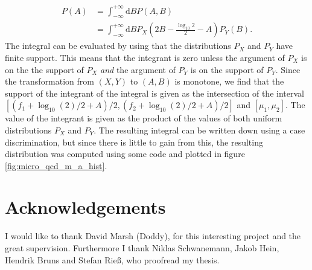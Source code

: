 \documentclass[twoside,a4paper, 12pt]{article}
\newcommand{\diff}{\mathrm{d}}
\numberwithin{equation}{section}
\begin{document}
\begin{align*}
    P(A) &= \int_{- \infty}^{+ \infty} \diff B P(A, B) \\
         &= \int_{- \infty}^{+ \infty} \diff B P_X(2 B - \frac{\log_{10} 2}{2} - A) P_{Y}(B).
\end{align*}
The integral can be evaluated by using that the distributions $P_X$ and $P_Y$ have finite support.
This means that the integrant is zero unless the argument of $P_X$ is on the the support of $P_X$ \emph{and} the argument of 
$P_Y$ is on the support of $P_Y$. Since the transformation from $(X,Y)$ to $(A,B)$ is monotone, we find that
the support of the integrant of the integral is given as the intersection of the interval
$[(f_1 + \log_{10}(2) / 2 + A) / 2, (f_2 + \log_{10}(2) / 2 + A) / 2]$ and $[\mu_1, \mu_2]$.
The value of the integrant is given as the product of the values of both uniform distributions $P_X$ and $P_Y$.
The resulting integral can be written down using a case discrimination, but since there is little to gain from this,
the resulting distribution was computed using some code and plotted in figure \ref{fig:micro_qcd_m_a_hist}.

\newpage
%
\printbibliography

\newpage
\pagestyle{empty}
\section*{Acknowledgements}
I would like to thank David Marsh (Doddy), for this interesting  project and the great supervision.
Furthermore I thank Niklas Schwanemann, Jakob Hein, Hendrik Bruns and Stefan Rieß, who proofread my thesis.
\end{document}
